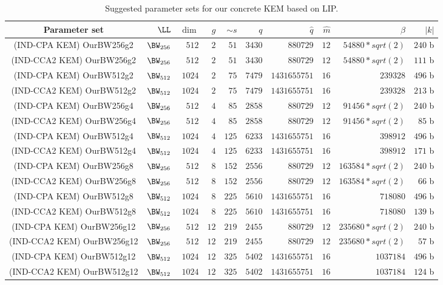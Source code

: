 \begin{table}[htbp]
	\centering
	\setlength{\tabcolsep}{3pt}
	\caption{Suggested parameter sets for our concrete KEM based on LIP.}
	\begin{tabular}{crrrrrrrrr}
		\toprule
		Parameter set & $\LL$ & $\dim$ & $g$ & $\sim s$ & $q$ & $\hat{q}$ & $\hat{m}$ & $\beta$ & $|k|$ \\
		\midrule
		(IND-CPA KEM) OurBW256g2 & $\BW_{256}$ & $512$ & $2$ & $51$ & $3430$ & $880729$ & $12$ & $54880*sqrt(2)$ & $240$ b \\
		(IND-CCA2 KEM) OurBW256g2 & $\BW_{256}$ & $512$ & $2$ & $51$ & $3430$ & $880729$ & $12$ & $54880*sqrt(2)$ & $111$ b \\
		(IND-CPA KEM) OurBW512g2 & $\BW_{512}$ & $1024$ & $2$ & $75$ & $7479$ & $1431655751$ & $16$ & $239328$ & $496$ b \\
		(IND-CCA2 KEM) OurBW512g2 & $\BW_{512}$ & $1024$ & $2$ & $75$ & $7479$ & $1431655751$ & $16$ & $239328$ & $213$ b \\
		(IND-CPA KEM) OurBW256g4 & $\BW_{256}$ & $512$ & $4$ & $85$ & $2858$ & $880729$ & $12$ & $91456*sqrt(2)$ & $240$ b \\
		(IND-CCA2 KEM) OurBW256g4 & $\BW_{256}$ & $512$ & $4$ & $85$ & $2858$ & $880729$ & $12$ & $91456*sqrt(2)$ & $85$ b \\
		(IND-CPA KEM) OurBW512g4 & $\BW_{512}$ & $1024$ & $4$ & $125$ & $6233$ & $1431655751$ & $16$ & $398912$ & $496$ b \\
		(IND-CCA2 KEM) OurBW512g4 & $\BW_{512}$ & $1024$ & $4$ & $125$ & $6233$ & $1431655751$ & $16$ & $398912$ & $171$ b \\
		(IND-CPA KEM) OurBW256g8 & $\BW_{256}$ & $512$ & $8$ & $152$ & $2556$ & $880729$ & $12$ & $163584*sqrt(2)$ & $240$ b \\
		(IND-CCA2 KEM) OurBW256g8 & $\BW_{256}$ & $512$ & $8$ & $152$ & $2556$ & $880729$ & $12$ & $163584*sqrt(2)$ & $66$ b \\
		(IND-CPA KEM) OurBW512g8 & $\BW_{512}$ & $1024$ & $8$ & $225$ & $5610$ & $1431655751$ & $16$ & $718080$ & $496$ b \\
		(IND-CCA2 KEM) OurBW512g8 & $\BW_{512}$ & $1024$ & $8$ & $225$ & $5610$ & $1431655751$ & $16$ & $718080$ & $139$ b \\
		(IND-CPA KEM) OurBW256g12 & $\BW_{256}$ & $512$ & $12$ & $219$ & $2455$ & $880729$ & $12$ & $235680*sqrt(2)$ & $240$ b \\
		(IND-CCA2 KEM) OurBW256g12 & $\BW_{256}$ & $512$ & $12$ & $219$ & $2455$ & $880729$ & $12$ & $235680*sqrt(2)$ & $57$ b \\
		(IND-CPA KEM) OurBW512g12 & $\BW_{512}$ & $1024$ & $12$ & $325$ & $5402$ & $1431655751$ & $16$ & $1037184$ & $496$ b \\
		(IND-CCA2 KEM) OurBW512g12 & $\BW_{512}$ & $1024$ & $12$ & $325$ & $5402$ & $1431655751$ & $16$ & $1037184$ & $124$ b \\
		\bottomrule
	\end{tabular}
\end{table}
